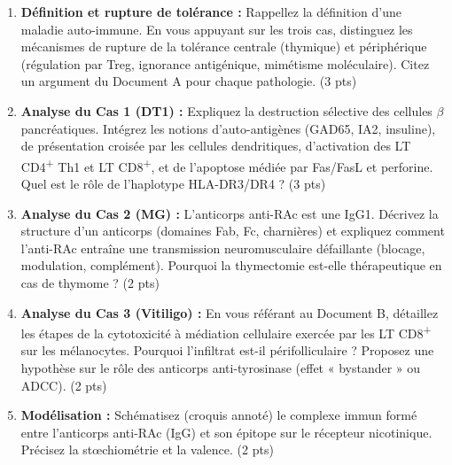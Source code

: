 \documentclass[11pt]{article}
\begin{document}
\begin{exercice}
\begin{enumerate}
    \item \textbf{Définition et rupture de tolérance :} Rappellez la définition d'une maladie auto-immune. En vous appuyant sur les trois cas, distinguez les mécanismes de rupture de la tolérance centrale (thymique) et périphérique (régulation par Treg, ignorance antigénique, mimétisme moléculaire). Citez un argument du Document A pour chaque pathologie. (3 pts)
    \item \textbf{Analyse du Cas 1 (DT1) :} Expliquez la destruction sélective des cellules $\beta$ pancréatiques. Intégrez les notions d'auto-antigènes (GAD65, IA2, insuline), de présentation croisée par les cellules dendritiques, d'activation des LT CD4\textsuperscript{+} Th1 et LT CD8\textsuperscript{+}, et de l'apoptose médiée par Fas/FasL et perforine. Quel est le rôle de l'haplotype HLA-DR3/DR4 ? (3 pts)
    \item \textbf{Analyse du Cas 2 (MG) :} L'anticorps anti-RAc est une IgG1. Décrivez la structure d'un anticorps (domaines Fab, Fc, charnières) et expliquez comment l'anti-RAc entraîne une transmission neuromusculaire défaillante (blocage, modulation, complément). Pourquoi la thymectomie est-elle thérapeutique en cas de thymome ? (2 pts)
    \item \textbf{Analyse du Cas 3 (Vitiligo) :} En vous référant au Document B, détaillez les étapes de la cytotoxicité à médiation cellulaire exercée par les LT CD8\textsuperscript{+} sur les mélanocytes. Pourquoi l'infiltrat est-il périfolliculaire ? Proposez une hypothèse sur le rôle des anticorps anti-tyrosinase (effet « bystander » ou ADCC). (2 pts)
    \item \textbf{Modélisation :} Schématisez (croquis annoté) le complexe immun formé entre l'anticorps anti-RAc (IgG) et son épitope sur le récepteur nicotinique. Précisez la stœchiométrie et la valence. (2 pts)
\end{enumerate}
\end{exercice}
\end{document}
